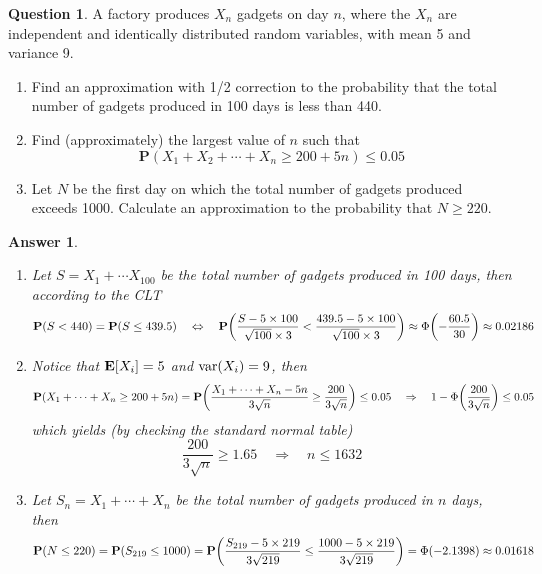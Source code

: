 \documentclass[utf8]{article}
\theoremstyle{definition}%
\newtheorem{question}{Question} %
\theoremstyle{plain}%
\newtheorem{answer}{Answer} %
\begin{document}
\begin{question}
    A factory produces $X_n$ gadgets on day $n$, where the $X_n$ are independent and identically distributed random variables, with mean 5 and variance 9.
    \begin{enumerate}[label=(\alph*)]
        \item Find an approximation with 1/2 correction to the probability that the total number of gadgets produced in 100 days is less than 440.
        \item  Find (approximately) the largest value of $n$ such that
        \begin{equation}
            \mathbf{P}(X_1 + X_2 + \cdots + X_n \geq 200 + 5n) \leq 0.05
        \end{equation}
        \item Let $N$ be the first day on which the total number of gadgets produced exceeds 1000. Calculate an approximation to the probability that $N \geq 220$.
    \end{enumerate}
\end{question}
\begin{answer} ~
    \begin{enumerate}[label=(\alph*)]
        \item Let $S = X_1 + \cdots X_100$ be the total number of gadgets produced in 100 days, then according to the CLT
        \begin{equation}
            \mathbf{P}(S < 440) = \mathbf{P}(S \leq 439.5) \quad\Leftrightarrow\quad \mathbf{P}\qty(\frac{S - 5 \times 100}{\sqrt{100} \times 3} < \frac{439.5 - 5 \times 100}{\sqrt{100} \times 3}) \approx \Phi\qty(- \frac{60.5}{30}) \approx 0.02186
        \end{equation}
        \item Notice that $\mathbf{E}[X_i] = 5$ and $\mathrm{var}(X_i) = 9$, then
        \begin{equation}
            \mathbf{P}(X_1 + \cdots + X_n \geq 200 + 5n) = \mathbf{P}\qty(\frac{X_1 + \cdots + X_n - 5n}{3\sqrt{n}} \geq \frac{200}{3\sqrt{n}}) \leq 0.05 \quad\Rightarrow\quad 1 - \Phi\qty(\frac{200}{3\sqrt{n}}) \leq 0.05
        \end{equation}
        which yields (by checking the standard normal table)
        \begin{equation}
            \frac{200}{3\sqrt{n}} \geq 1.65 \quad\Rightarrow\quad n \leq 1632
        \end{equation}
        \item Let $S_n = X_1 + \cdots + X_n$ be the total number of gadgets produced in $n$ days, then
        \begin{equation}
            \mathbf{P}(N \leq 220) = \mathbf{P}(S_{219} \leq 1000) = \mathbf{P}\qty(\frac{S_{219} - 5 \times 219}{3\sqrt{219}} \leq \frac{1000 - 5 \times 219}{3\sqrt{219}}) = \Phi(-2.1398) \approx 0.01618
        \end{equation}
    \end{enumerate}
\end{answer}
\end{document}
